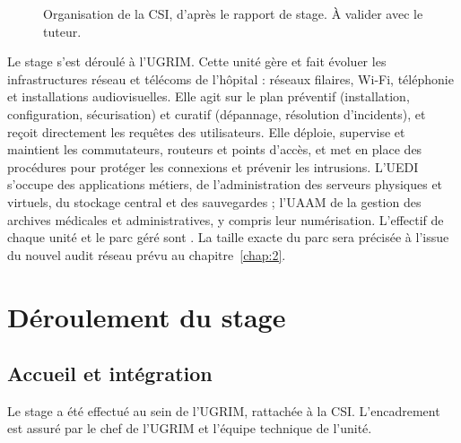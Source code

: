 \begin{figure}[htbp]
\centering
\small
{}
\caption{Organisation de la CSI, d'après le rapport de stage\cite{kaho2026}. À valider avec le tuteur.}
\label{fig:csi}
\end{figure}

Le stage s'est déroulé à l'UGRIM. Cette unité gère et fait évoluer les infrastructures réseau et télécoms de l'hôpital : réseaux filaires, Wi-Fi, téléphonie et installations audiovisuelles. Elle agit sur le plan préventif (installation, configuration, sécurisation) et curatif (dépannage, résolution d'incidents), et reçoit directement les requêtes des utilisateurs\cite{kaho2026}. Elle déploie, supervise et maintient les commutateurs, routeurs et points d'accès, et met en place des procédures pour protéger les connexions et prévenir les intrusions\cite{kaho2026}. L'UEDI s'occupe des applications métiers, de l'administration des serveurs physiques et virtuels, du stockage central et des sauvegardes ; l'UAAM de la gestion des archives médicales et administratives, y compris leur numérisation\cite{kaho2026}. L'effectif de chaque unité et le parc géré sont . La taille exacte du parc sera précisée à l'issue du nouvel audit réseau prévu au chapitre~\ref{chap:2}.

\section{Déroulement du stage}

\subsection{Accueil et intégration}
Le stage a été effectué au sein de l'UGRIM, rattachée à la CSI. L'encadrement est assuré par le chef de l'UGRIM et l'équipe technique de l'unité\cite{kaho2026}. 

